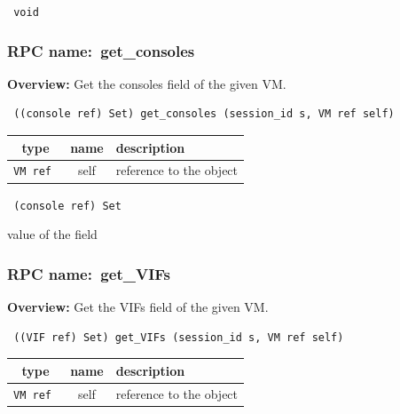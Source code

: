 \vspace{0.3cm}

{\tt 
void
}



\vspace{0.3cm}
\vspace{0.3cm}
\vspace{0.3cm}
\subsubsection{RPC name:~get\_consoles}

{\bf Overview:} 
Get the consoles field of the given VM.

\begin{verbatim} ((console ref) Set) get_consoles (session_id s, VM ref self)\end{verbatim}



 
\vspace{0.3cm}
\begin{tabular}{|c|c|p{7cm}|}
 \hline
{\bf type} & {\bf name} & {\bf description} \\ \hline
{\tt VM ref } & self & reference to the object \\ \hline 

\end{tabular}

\vspace{0.3cm}

{\tt 
(console ref) Set
}


value of the field
\vspace{0.3cm}
\vspace{0.3cm}
\vspace{0.3cm}
\subsubsection{RPC name:~get\_VIFs}

{\bf Overview:} 
Get the VIFs field of the given VM.

\begin{verbatim} ((VIF ref) Set) get_VIFs (session_id s, VM ref self)\end{verbatim}



 
\vspace{0.3cm}
\begin{tabular}{|c|c|p{7cm}|}
 \hline
{\bf type} & {\bf name} & {\bf description} \\ \hline
{\tt VM ref } & self & reference to the object \\ \hline 

\end{tabular}


